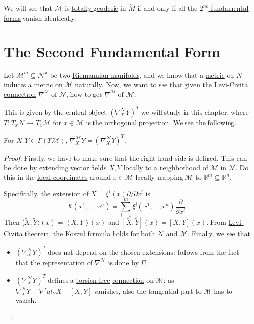 \begin{note}
	We will see that \(\mathcal{M} \) is \hyperref[def:totally-geodesic]{totally geodesic} in \(\widetilde{M} \) if and only if all the \hyperref[def:2nd-fundamental-form]{\(2^{nd}\)-fundamental forms} vanish identically.
\end{note}

\section{The Second Fundamental Form}
Let \(\mathcal{M} ^m \subseteq \mathcal{N} ^n\) be two \hyperref[def:Riemannian-manifold]{Riemannian manifolds}, and we know that a \hyperref[def:Riemannian-metric]{metric} on \(N\) induces a \hyperref[def:Riemannian-metric]{metric} on \(\mathcal{M} \) naturally. Now, we want to see that given the \hyperref[def:Levi-Civita-connection]{Levi-Civita connection} \(\nabla ^\mathcal{N} \) of \(\mathcal{N} \), how to get \(\nabla ^\mathcal{M} \) of \(\mathcal{M} \).

This is given by the central object \((\nabla ^\mathcal{N} _X Y)^T\) we will study in this chapter, where \(T\colon T_x \mathcal{N} \to T_x \mathcal{M} \) for \(x\in \mathcal{M} \) is the orthogonal projection. We see the following.

\begin{theorem}
	For \(X, Y\in \Gamma (T \mathcal{M} )\), \(\nabla ^\mathcal{M} _X Y = \left( \nabla ^\mathcal{N} _X Y \right)^{T}\).
\end{theorem}
\begin{proof}
	Firstly, we have to make sure that the right-hand side is defined. This can be done by extending \hyperref[def:vector-field]{vector fields} \(X, Y\) locally to a neighborhood of \(\mathcal{M} \) in \(\mathcal{N} \). Do this in the \hyperref[def:local-coordinate]{local coordinates} around \(x\in \mathcal{M} \) locally mapping \(\mathcal{M} \) to \(\mathbb{R} ^m \subseteq \mathbb{R} ^n\).

	Specifically, the extension of \(X = \xi ^i(x) \partial / \partial x^i\) is
	\[
		\widetilde{X} (x^1, \ldots , x^n) = \sum_{i=1}^{m} \xi ^i(x^1, \ldots , x^n) \frac{\partial }{\partial x^i}.
	\]
	Then \(\langle \widetilde{X} , \widetilde{Y} \rangle (x) = \left\langle X, Y \right\rangle (x)\) and \([\widetilde{X} , \widetilde{Y} ](x) = [X, Y](x)\). From \hyperref[thm:Levi-Civita]{Levi-Civita theorem}, the \hyperref[eq:Koszul-formula]{Koszul formula} holds for both \(\mathcal{N} \) and \(\mathcal{M} \). Finally, we see that
	\begin{itemize}
		\item \((\nabla _X^{\mathcal{N}} Y)^T\) does not depend on the chosen extensions: follows from the fact that the representation of \(\nabla ^\mathcal{N} \) is done by \(\Gamma \);
		\item \((\nabla _X^{\mathcal{N}} Y)^T\) defines a \hyperref[def:torsion-free]{torsion-free} \hyperref[def:linear-connection]{connection} on \(\mathcal{M} \): as \(\nabla ^\mathcal{N} _X Y - \nabla ^cal_Y X - [X, Y]\) vanishes, also the tangential part to \(\mathcal{M} \) has to vanish.
	\end{itemize}
\end{proof}

